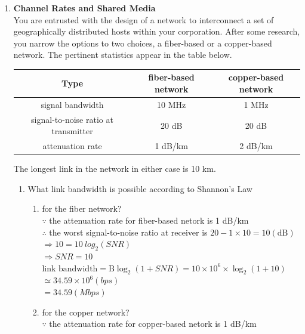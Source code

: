 \documentclass[10pt, a4paper]{article}
\begin{document}
\begin{enumerate}
\item\mbox{}\textbf{Channel Rates and Shared Media}\\
    You are entrusted with the design of a network to interconnect a set of geographically distributed hosts within your corporation. After some research, you narrow the options to two choices, a fiber-based or a copper-based network. The pertinent statistics appear in the table below.
    \begin{center}
        \begin{tabular}{|c|c|c|}
            \hline
            Type & fiber-based network & copper-based network\\
            \hline
            signal bandwidth & 10 MHz & 1 MHz\\
            \hline
            signal-to-noise ratio at transmitter & 20 dB & 20 dB\\
            \hline
            attenuation rate & 1 dB/km & 2 dB/km\\
            \hline
        \end{tabular}
    \end{center}
    The longest link in the network in either case is 10 km.
    \begin{enumerate}
    \item What link bandwidth is possible according to Shannon's Law
        \begin{enumerate}
        \item for the fiber network?\\
            \color{blue}
            $\because$ the attenuation rate for fiber-based netork is 1 dB/km\\
            $\therefore$ the worst signal-to-noise ratio at receiver is $20 - 1 \times 10 = 10 (\mbox{dB})$\\
            $\Rightarrow 10 = 10\ log_2(SNR)$\\
            $\Rightarrow SNR = 10$\\
            $\mbox{link bandwidth} = \mbox{B}\log_2(1 + SNR) = 10 \times 10^6 \times \log_2 (1 + 10)$\\
            $\simeq 34.59 \times 10^6 (bps)$\\
            $= 34.59 (Mbps)$
            \color{black}
        \item for the copper network?\\
            \color{blue}
            $\because$ the attenuation rate for copper-based netork is 1 dB/km\\

\end{enumerate}
\end{enumerate}
\end{enumerate}
\end{document}
